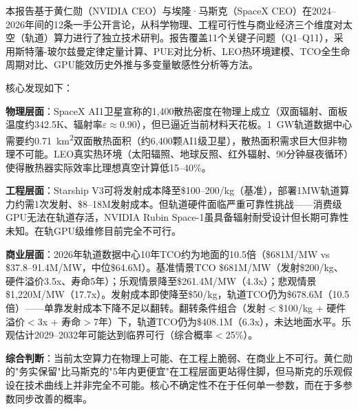 
本报告基于黄仁勋（NVIDIA CEO）与埃隆·马斯克（SpaceX CEO）在2024--2026年间的12条一手公开言论，从科学物理、工程可行性与商业经济三个维度对太空（轨道）算力进行了独立技术研判。报告覆盖11个关键子问题（Q1--Q11），采用斯特藩-玻尔兹曼定律定量计算、PUE对比分析、LEO热环境建模、TCO全生命周期对比、GPU能效历史外推与多变量敏感性分析等方法。

核心发现如下：

\textbf{物理层面}：SpaceX AI1卫星宣称的1,400\unitWpm{}散热密度在物理上成立（双面辐射、面板温度约342.5K、辐射率$\varepsilon\approx0.90$），但已逼近当前材料天花板。1~GW轨道数据中心需要约0.71~km\textsuperscript{2}双面散热面积（约6,400颗AI1级卫星），散热面积需求巨大但非物理不可能。LEO真实热环境（太阳辐照、地球反照、红外辐射、90分钟昼夜循环）使得散热器实际效率比理想真空计算低15--40\%。

\textbf{工程层面}：Starship V3可将发射成本降至\$100--200/kg（基准），部署1MW轨道算力约需1次发射、\$8--18M发射成本。但轨道硬件面临严重可靠性挑战——消费级GPU无法在轨道存活，NVIDIA Rubin Space-1虽具备辐射耐受设计但长期可靠性未知。在轨GPU级维修目前完全不可行。

\textbf{商业层面}：2026年轨道数据中心10年TCO约为地面的10.5倍（\$681M/MW vs \$37.8--91.4M/MW，中位\$64.6M）。基准情景TCO \$681M/MW（发射\$200/kg、硬件溢价3.5x、寿命5年）；乐观情景降至\$261.4M/MW（4.3x）；悲观情景\$1,220M/MW（17.7x）。发射成本即使降至\$50/kg，轨道TCO仍为\$678.6M（10.5倍）——单靠发射成本下降不足以翻转。翻转条件组合（发射$<$\$100/kg + 硬件溢价$<$3x + 寿命$>$7年）下，轨道TCO仍为\$408.1M（6.3x），未达地面水平。乐观估计2029--2032年可能达到临界可行（综合概率$<$25\%）。

\textbf{综合判断}：当前太空算力在物理上可能、在工程上脆弱、在商业上不可行。黄仁勋的"务实保留"比马斯克的"5年内更便宜"在工程层面更站得住脚，但马斯克的乐观假设在技术曲线上并非完全不可能。核心不确定性不在于任何单一参数，而在于多参数同步改善的概率。
